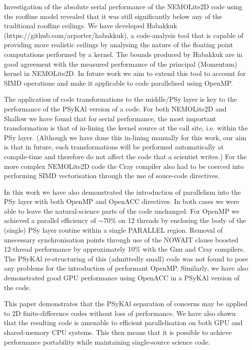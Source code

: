 \documentclass[gmd, manuscript]{copernicus}
\begin{document}
Investigation of the absolute serial performance of the NEMOLite2D
code using the roofline model revealed that it was still significantly
below any of the traditional roofline ceilings. We have developed
Habakkuk (https://github.com/arporter/habakkuk), a code-analysis tool
that is capable of providing more realistic ceilings by analysing the
nature of the floating point computations performed by a kernel. The
bounds produced by Habakkuk are in good agreement with the measured
performance of the principal (Momentum) kernel in NEMOLite2D. In
future work we aim to extend this tool to account for SIMD operations
and make it applicable to code parallelised using OpenMP.

The application of code transformations to the middle/PSy layer is key
to the performance of the {PS}y{KA}l version of a code. For both
NEMOLite2D and Shallow we have found that for serial performance, the
most important transformation is that of in-lining the kernel source
at the call site, i.e. within the PSy layer. (Although we have done
this in-lining manually for this work, our aim is that in future, such
transformations will be performed automatically at compile-time and
therefore do not affect the code that a scientist writes.)
For the more complex NEMOLite2D code the Cray compiler also
had to be coerced into performing SIMD vectorisation through the use
of souce-code directives.

In this work we have also demonstrated the introduction of parallelism
into the PSy layer with both OpenMP and OpenACC directives. In both
cases we were able to leave the natural-science parts of the code
unchanged. For OpenMP we achieved a parallel efficiency of $\sim70\%$
on 12 threads by enclosing the body of the (single) PSy layer routine
within a single PARALLEL region. Removal of unecessary synchronisation
points through use of the NOWAIT clause boosted 12-thread performance
by approximately 10\% with the Gnu and Cray compilers. The
{PS}y{KA}l re-structuring of this (admittedly small) code was not found
to pose any problems for the introduction of performant OpenMP.
Similarly, we have also demonstrated good GPU performance using OpenACC
in a {PS}y{KA}l version of the code.

This paper demonstrates that the {PS}y{KA}l separation of concerns may
be applied to 2D finite-difference codes without loss of
performance. We have also shown that the resulting code is amenable to
efficient parallelisation on both GPU and shared-memory CPU systems.
This then means that it is possible to achieve performance portability
while maintaining single-source science code.
\end{document}
